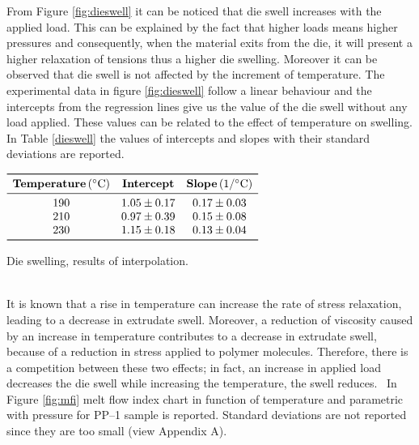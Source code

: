 \documentclass[a4paper, 11pt]{article}
\begin{document}
From Figure \ref{fig:dieswell} it can be noticed that die swell increases with the applied load. This can be explained by the fact that higher loads means higher pressures and consequently, when the material exits from the die, it will present a higher relaxation of tensions thus a higher die swelling. Moreover it can be observed that die swell is not affected by the increment of temperature. The experimental data in figure \ref{fig:dieswell} follow a linear behaviour and the intercepts from the regression lines give us the value of the die swell without any load applied. These values can be related to the effect of temperature on swelling.
In Table \ref{dieswell} the values of intercepts and slopes with their standard deviations are reported.
\begin{table}[htp]
	\centering
	$
	\begin{array}{ccc}
	\toprule
	\textbf{Temperature}\, (^\circ \text{C}) & \textbf{Intercept} & \textbf{Slope} \, (1/^\circ \text{C}) \\
	\midrule
	190 & 1.05 \pm 0.17 & 0.17 \pm 0.03 \\
	210 & 0.97 \pm 0.39 & 0.15 \pm 0.08 \\
	230 & 1.15 \pm 0.18 & 0.13 \pm 0.04 \\
	\bottomrule
	\end{array}
	$
	\caption{Die swelling, results of interpolation.}
	\label{tab:dieswell}
\end{table}\\
It is known that a rise in temperature can increase the rate of stress relaxation, leading to a decrease in extrudate swell. Moreover, a reduction of viscosity caused by an increase in temperature contributes to a decrease in extrudate swell, because of a reduction in stress applied to polymer molecules.
Therefore, there is a competition between these two effects; in fact, an increase in applied load decreases the die swell while increasing the temperature, the swell reduces.~\cite{swell}
\newpage
In Figure \ref{fig:mfi} melt flow index chart in function of temperature and parametric with pressure for PP–1 sample is reported. Standard deviations are not reported since they are too small (view Appendix A).
\end{document}
